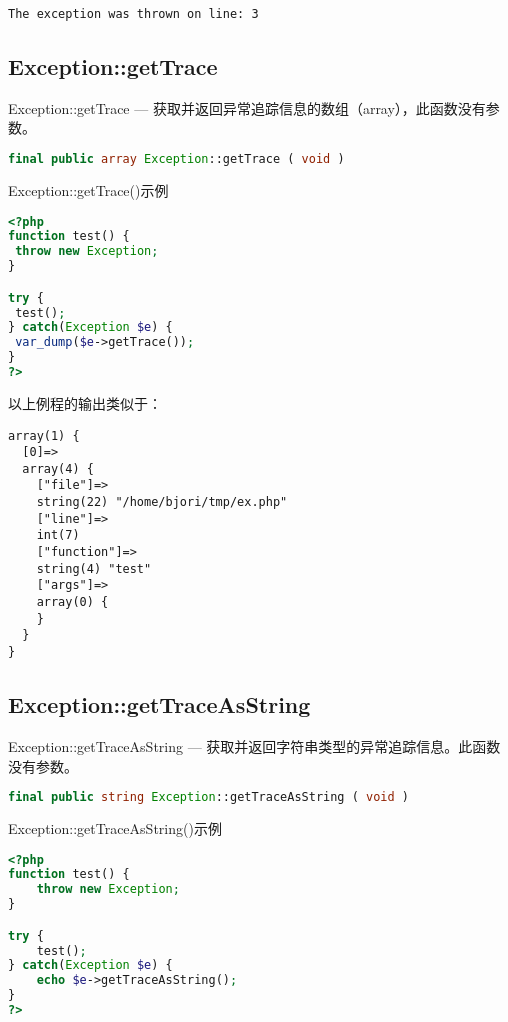 \begin{verbatim}
The exception was thrown on line: 3
\end{verbatim}


\subsection{Exception::getTrace}

Exception::getTrace — 获取并返回异常追踪信息的数组（array），此函数没有参数。

\begin{lstlisting}[language=PHP]
final public array Exception::getTrace ( void )
\end{lstlisting}




\begin{example}
Exception::getTrace()示例
\begin{lstlisting}[language=PHP]
<?php
function test() {
 throw new Exception;
}

try {
 test();
} catch(Exception $e) {
 var_dump($e->getTrace());
}
?>
\end{lstlisting}
\end{example}

以上例程的输出类似于：

\begin{verbatim}
array(1) {
  [0]=>
  array(4) {
    ["file"]=>
    string(22) "/home/bjori/tmp/ex.php"
    ["line"]=>
    int(7)
    ["function"]=>
    string(4) "test"
    ["args"]=>
    array(0) {
    }
  }
}
\end{verbatim}


\subsection{Exception::getTraceAsString}


Exception::getTraceAsString — 获取并返回字符串类型的异常追踪信息。此函数没有参数。


\begin{lstlisting}[language=PHP]
final public string Exception::getTraceAsString ( void )
\end{lstlisting}



\begin{example}
Exception::getTraceAsString()示例
\begin{lstlisting}[language=PHP]
<?php
function test() {
    throw new Exception;
}

try {
    test();
} catch(Exception $e) {
    echo $e->getTraceAsString();
}
?>
\end{lstlisting}
\end{example}

